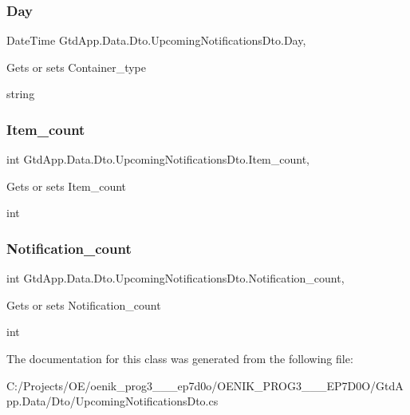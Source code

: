 \subsubsection{Day}
{\footnotesize\ttfamily Date\+Time Gtd\+App.\+Data.\+Dto.\+Upcoming\+Notifications\+Dto.\+Day\hspace{0.3cm}{\ttfamily [get]}, {\ttfamily [set]}}



Gets or sets Container\+\_\+type 

string\mbox{\label{class_gtd_app_1_1_data_1_1_dto_1_1_upcoming_notifications_dto_acd9f0176dd1da453e5dd2d11fd68eafe}} 
\subsubsection{Item\+\_\+count}
{\footnotesize\ttfamily int Gtd\+App.\+Data.\+Dto.\+Upcoming\+Notifications\+Dto.\+Item\+\_\+count\hspace{0.3cm}{\ttfamily [get]}, {\ttfamily [set]}}



Gets or sets Item\+\_\+count 

int\mbox{\label{class_gtd_app_1_1_data_1_1_dto_1_1_upcoming_notifications_dto_a3f46ebac8f642e226e2ba03eaea53323}} 
\subsubsection{Notification\+\_\+count}
{\footnotesize\ttfamily int Gtd\+App.\+Data.\+Dto.\+Upcoming\+Notifications\+Dto.\+Notification\+\_\+count\hspace{0.3cm}{\ttfamily [get]}, {\ttfamily [set]}}



Gets or sets Notification\+\_\+count 

int

The documentation for this class was generated from the following file\+:\begin{DoxyCompactItemize}
\item 
C\+:/\+Projects/\+O\+E/oenik\+\_\+prog3\+\_\+\_\+\_\+ep7d0o/\+O\+E\+N\+I\+K\+\_\+\+P\+R\+O\+G3\+\_\+\_\+\_\+\+E\+P7\+D0\+O/\+Gtd\+App.\+Data/\+Dto/Upcoming\+Notifications\+Dto.\+cs\end{DoxyCompactItemize}
